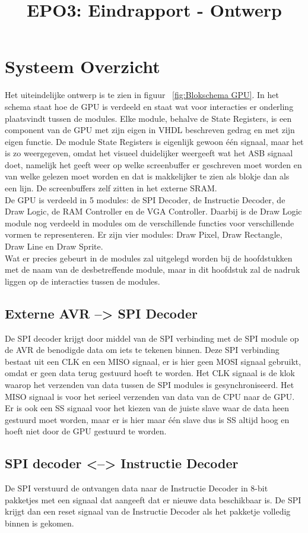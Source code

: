 \documentclass{scrartcl} %
\author{}
\title{EPO3: Eindrapport - Ontwerp}
\begin{document}
\chapter{Systeem Overzicht}
\label{ch:ontwerp}

Het uiteindelijke ontwerp is te zien in figuur ~\ref{fig:Blokschema GPU}. In het schema staat hoe de GPU is verdeeld en staat wat voor interacties er onderling plaatsvindt tussen de modules.
Elke module, behalve de State Registers, is een component van de GPU met zijn eigen in VHDL beschreven gedrag en met zijn eigen functie. De module State Registers is eigenlijk gewoon één signaal, maar het is zo weergegeven, omdat het visueel duidelijker weergeeft wat het ASB signaal doet, namelijk het geeft weer op welke screenbuffer er geschreven moet worden en van welke gelezen moet worden en dat is makkelijker te zien als blokje dan als een lijn. De screenbuffers zelf zitten in het externe SRAM. 
\\ De GPU is verdeeld in 5 modules: de SPI Decoder, de Instructie Decoder, de Draw Logic, de RAM Controller en de VGA Controller. Daarbij is de Draw Logic module nog verdeeld in modules om de verschillende functies voor verschillende vormen te representeren. Er zijn vier modules: Draw Pixel, Draw Rectangle, Draw Line en Draw Sprite.
\\Wat er precies gebeurt in de modules zal uitgelegd worden bij de hoofdstukken met de naam van de desbetreffende module, maar in dit hoofdstuk zal de nadruk liggen op de interacties tussen de modules.

\section{Externe AVR --> SPI Decoder}
De SPI decoder krijgt door middel van de SPI verbinding met de SPI module op de AVR de benodigde data om iets te tekenen binnen. Deze SPI verbinding bestaat uit een CLK en een MISO signaal, er is hier geen MOSI signaal gebruikt, omdat er geen data terug gestuurd hoeft te worden. Het CLK signaal is de klok waarop het verzenden van data tussen de SPI modules is gesynchroniseerd. Het MISO signaal is voor het serieel verzenden van data van de CPU naar de GPU. Er is ook een SS signaal voor het kiezen van de juiste slave waar de data heen gestuurd moet worden, maar er is hier maar één slave dus is SS altijd hoog en hoeft niet door de GPU gestuurd te worden.

\section{SPI decoder <--> Instructie Decoder}
De SPI verstuurd de ontvangen data naar de Instructie Decoder in 8-bit pakketjes met een signaal dat aangeeft dat er nieuwe data beschikbaar is. De SPI krijgt dan een reset signaal van de Instructie Decoder als het pakketje volledig binnen is gekomen.
\end{document}

